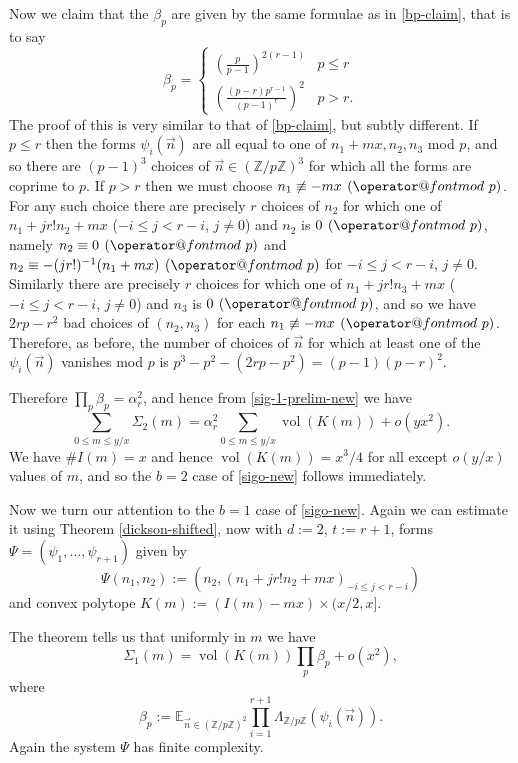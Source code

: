 \documentclass[11pt]{amsart}
\makeatletter
\numberwithin{equation}{section}  %
\theoremstyle{remark}
\theoremstyle{plain}
\numberwithin{equation}{section}
\newcommand{\Z}{\mathbb{Z}}
\newcommand{\E}{\mathbb{E}}  %
\renewcommand{\pmod}[1]{\allowbreak\mkern7mu({\operator@font mod}\,\,#1)}
\renewcommand{\leq}{\leqslant}
\renewcommand{\(}{\left(}
\renewcommand{\)}{\right)}
\newcommand{\pfrac}[2]{\left(\frac{#1}{#2}\right)}  %
\newcommand{\vect}[1]{{\ensuremath{\vec{#1}}}}
\newcommand{\vol}{\operatorname{vol}}
\makeatother
\begin{document}
Now we claim that the $\beta_p$ are given by the same formulae as in \eqref{bp-claim}, that is to say
\[ \beta_p = \left\{ \begin{array}{ll} (\frac{p}{p-1})^{2(r - 1)} & p
  \leq r \\ \pfrac{(p-r)p^{r-1}}{(p-1)^r}^2 & p > r.\end{array}
\right. \]
The proof of this is very similar to that of \eqref{bp-claim}, but subtly different. If $p \leq r$ then the forms $\psi_i(\vect{n})$ are all equal to one of $n_1+ mx,n_2,n_3$ mod $p$, and so there are $(p-1)^3$ choices of $\vect{n} \in (\Z/p\Z)^3$ for which all the forms are coprime to $p$. If $p > r$ then we must choose $n_1 \not\equiv -mx \pmod{p}$. For any such choice there are precisely $r$ choices of $n_2$ for which one of $n_1 + jr! n_2 + mx$ ($-i \leq j < r - i$, $j \neq 0$) and $n_2$ is $0 \pmod{p}$, namely $n_2 \equiv 0\pmod{p}$ and $n_2 \equiv -(jr!)^{-1} (n_1 + mx) \pmod{p}$ for $-i \leq j < r-i$, $j \neq 0$. Similarly there are precisely $r$ choices for which one of $n_1 + jr! n_3 + mx$ ($-i \leq j < r-i$, $j \neq 0$) and $n_3$ is $0 \pmod{p}$, and so we have $2rp - r^2$ bad choices of $(n_2,n_3)$ for each $n_1 \not\equiv -mx \pmod{p}$. Therefore, as before, the number of choices of $\vect{n}$ for which at least one of the $\psi_i(\vect{n})$ vanishes mod $p$ is $p^3 - p^2 - (2rp - p^2) = (p-1)(p-r)^2$.

Therefore $\prod_p \beta_p = \alpha_r^2$, and hence from \eqref{sig-1-prelim-new} we have
\[ \sum_{0 \leq m \leq y/x} \Sigma_2(m) = \alpha_r^2 \sum_{0 \leq m \leq y/x} \vol(K(m)) + o(y x^2).\] 
We have $\# I(m) = x$ and hence $\vol(K(m)) = x^3/4$ for all except $o(y/x)$ values of $m$, and so the $b=2$ case of \eqref{sigo-new} follows immediately.

Now we turn our attention to the $b=1$ case of \eqref{sigo-new}. Again we can estimate it using Theorem \ref{dickson-shifted}, now with $d := 2$, $t := r+1$, forms $\Psi = (\psi_1,\dots, \psi_{r+1})$ given by 
\[ \Psi(n_1,n_2) := ( n_2, (n_1 + jr! n_2 + mx)_{-i \leq j < r-i})\] and convex polytope $K(m) := (I(m) - mx) \times (x/2,x]$. 

 The theorem tells us that uniformly in $m$ we have
\begin{equation}\label{sig-2-prelim-new} \Sigma_1(m) = \vol(K(m)) \prod_p \beta_p + o(x^2),\end{equation} where 
\[ \beta_p := \E_{\vect{n} \in (\Z/p\Z)^2} \prod_{i = 1}^{r+1} \Lambda_{\Z/p\Z}(\psi_i(\vect{n})).\]
Again the system $\Psi$ has finite complexity. 
\end{document}
